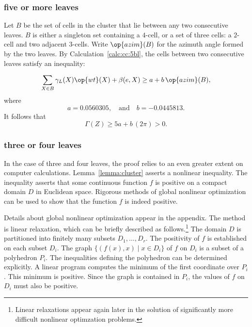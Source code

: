 {\subsubsection{five or more leaves}

Let $B$ be the set of cells in the cluster that lie between any two
consecutive leaves.  $B$ is either a singleton set containing a
$4$-cell, or a set of three cells: a $2$-cell and two adjacent
$3$-cells.  Write $\op{azim}(B)$ for the azimuth angle formed by the
two leaves.  By Calculation~\ref{calc:cc:5bl}, the cells between two
consecutive leaves satisfy an
inequality: %

\begin{displaymath} 
\sum_{X\in B} \gamma_L(X)\op{wt}(X) + \beta(e,X) \ge a + b\,\op{azim}(B),
\end{displaymath}
where
\begin{displaymath} 
a= 0.0560305, \quad\text{and}\quad  b= -0.0445813.
\end{displaymath}
It follows that
\begin{displaymath} 
\Gamma(Z) \ge 5 a + b\, (2\pi) > 0.
\end{displaymath}

\subsubsection{three or four leaves}\label{sec:3or4}

In the case of three and four leaves, the proof relies to an even
greater extent on computer calculations.  
Lemma~\ref{lemma:cluster} asserts a nonlinear inequality.  The inequality
asserts that some continuous function $f$ is positive on a compact
domain $D$ in Euclidean space.  Rigorous methods of global nonlinear
optimization can be used to show that the function $f$ is indeed
positive.

Details about global nonlinear optimization appear in the appendix.
The method is linear relaxation, which can be briefly described as
follows.\footnote{Linear relaxations appear again later in the
solution of significantly more difficult nonlinear optimzation
problems.}  The domain $D$ is partitioned into finitely many subsets
$D_1,\ldots, D_r$.  The positivity of $f$ is established on each
subset $D_i$.  The graph $\{(f(x), x)\mid x\in D_i\}$ of $f$ on $D_i$
is a subset of a polyhedron $P_i$.  The inequalities defining the
polyhedron can be determined explicitly.  A linear program computes
the minimum of the first coordinate over $P_i$.  This minimum is
positive.  Since the graph is contained in $P_i$, the values of $f$ on
$D_i$ must also be positive.

}
